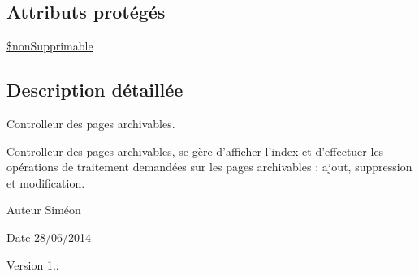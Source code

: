 \subsection*{Attributs protégés}
\begin{DoxyCompactItemize}
\item 
\hyperlink{class_applications_1_1_backend_1_1_modules_1_1_page_archivable_1_1_page_archivable_controller_a25c6842b81a175d908c8994c883d5fe1}{\$non\+Supprimable}
\end{DoxyCompactItemize}


\subsection{Description détaillée}
Controlleur des pages archivables. 

Controlleur des pages archivables, se gère d'afficher l'index et d'effectuer les opérations de traitement demandées sur les pages archivables \+: ajout, suppression et modification. \begin{DoxyAuthor}{Auteur}
Siméon 
\end{DoxyAuthor}
\begin{DoxyDate}{Date}
28/06/2014 
\end{DoxyDate}
\begin{DoxyVersion}{Version}
1.. 
\end{DoxyVersion}


